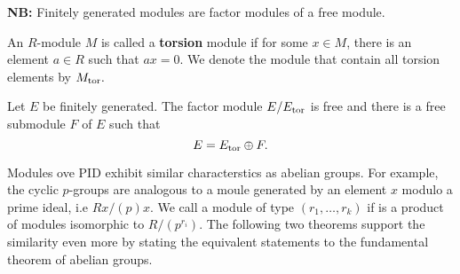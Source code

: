     \noindent \textbf{NB:} Finitely generated modules are factor modules of a free module.

    \begin{definition}
        An $R$-module $M$ is called a \textbf{torsion} module if for some $x \in M$, there is an element $a \in R$ such that $ax = 0$. We denote the module that contain all torsion elements by $M_{\mathrm{tor}}.$
    \end{definition}

    \begin{theorem}
        Let $E$ be finitely generated. The factor module $E/E_{\mathrm{tor}}$ is free and there is a free submodule $F$ of $E$ such that 
        $$E = E_{\mathrm{tor}} \oplus F.$$
    \end{theorem}   

    Modules ove PID exhibit similar characterstics as abelian groups. For example, the cyclic $p$-groups are analogous to a moule generated by an element $x$ modulo a prime ideal, i.e $Rx/(p)x$. We call a module of type $(r_1, \dots, r_k)$ if is a product of modules isomorphic to $R/(p^{r_i}).$ The following two theorems support the similarity even more by stating the equivalent statements to the fundamental theorem of abelian groups.
    
